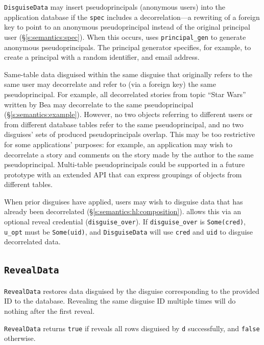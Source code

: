 %
\texttt{DisguiseData} may insert pseudoprincipals (anonymous users) into the
application database if the \texttt{spec} includes a decorrelation---a rewriting
of a foreign key to point to an anonymous pseudoprincipal instead of the
original principal user (\S\ref{s:semantics:spec}).  When this occurs, \sys
uses \texttt{principal\_gen} to generate anonymous pseudoprincipals. The
principal generator specifies, for example, to create a principal with a random
identifier, and email address.
%

%
Same-table data disguised within the same disguise that originally refers to the
same user may decorrelate and refer to (via a foreign key) the same
pseudoprincipal.
%
For example, all decorrelated stories from topic ``Star Wars'' written by Bea
may decorrelate to the same pseudoprincipal (\S\ref{s:semantics:example}).
%
However, no two objects referring to different users or from different database
tables refer to the same pseudoprincipal, and no two disguises' sets of produced
pseudoprincipals overlap.
%
This may be too restrictive for some applications' purposes: for example, an
application may wish to decorrelate a story and comments on the story made by
the author to the same pseudoprincipal.
%
Multi-table pseudoprincipals could be supported in a future \sys prototype with
an extended API that can express groupings of objects from different tables.

When prior disguises have applied, users may wish to disguise data that has
already been decorrelated (\S\ref{s:semantics:hl:composition}).  \sys allows
this via an optional reveal credential (\texttt{disguise\_over}). If
\texttt{disguise\_over} is \texttt{Some(cred)}, \texttt{u\_opt} must be
\texttt{Some(uid)}, and \texttt{DisguiseData} will use \texttt{cred} and
\texttt{uid} to disguise decorrelated data.

\subsection{\texttt{RevealData}}
\label{s:semantics:revealdata}

\texttt{RevealData} restores data disguised by the disguise corresponding to the provided ID to
the database. Revealing the same disguise ID multiple times will do nothing
after the first reveal. 

\texttt{RevealData} returns \texttt{true} if \sys reveals all rows disguised by \texttt{d}
successfully, and \texttt{false} otherwise.

